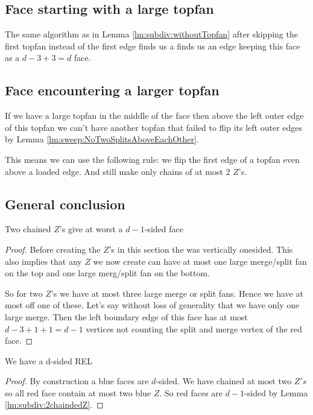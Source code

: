 \subsection{Face starting with a large topfan}
The same algorithm as in Lemma \ref{lm:subdiv:withoutTopfan} after skipping the first topfan instead of the first edge finds us a finds us an edge keeping this face as a $ d - 3 +3 = d$ face.

\subsection{Face encountering a larger topfan}
If we have a large topfan in the middle of the face then above the left outer edge of this topfan we can't have another topfan that failed to flip its left outer edges by Lemma \ref{lm:sweep:NoTwoSplitsAboveEachOther}.

This means we can use the following rule: we flip the first edge of a topfan even above a loaded edge. And still make only chains of at most $2$ $Z$'s.


\subsection{General conclusion}
\begin{lemma}
  \label{lm:subdiv:2chaindedZ}
  Two chained $Z$'s give at worst a $d-1$-sided face
\end{lemma}
\begin{proof}
  Before creating the $Z$'s in this section the \rel was vertically onesided. This also implies that  any $Z$ we now create can have at most one large merge/split fan on the top and one large merg/split fan on the bottom.

  So for two $Z$'s we have at most three large merge or split fans. Hence we have at most off one of these. Let's say without loss of generality that we have only one large merge. Then the left boundary edge of this face has at most $d-3 + 1 +1 =d-1$ vertices not counting the split and merge vertex of the red face.
\end{proof}

\begin{thrm}
  \label{th:final}
  We have a d-sided REL
\end{thrm}

\begin{proof}
  By construction a blue faces are $d$-sided. We have chained at most two $Z's$ so all red face contain at most two blue $Z$. So red faces are $d-1$-sided by Lemma \ref{lm:subdiv:2chaindedZ}.
\end{proof}
